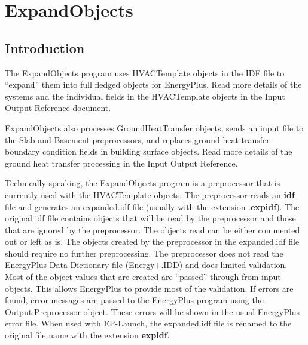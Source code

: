 \section{ExpandObjects}

\subsection{Introduction}\label{ExpandObjects}

The ExpandObjects program uses HVACTemplate objects in the IDF file to ``expand'' them into full fledged objects for EnergyPlus. Read more details of the systems and the individual fields in the HVACTemplate objects in the Input Output Reference document.

ExpandObjects also processes GroundHeatTransfer objects, sends an input file to the Slab and Basement preprocessors, and replaces ground heat transfer boundary condition fields in building surface objects. Read more details of the ground heat transfer processing in the Input Output Reference.

Technically speaking, the ExpandObjects program is a preprocessor that is currently used with the HVACTemplate objects. The preprocessor reads an \textbf{idf} file and generates an expanded.idf file (usually with the extension .\textbf{expidf}). The original idf file contains objects that will be read by the preprocessor and those that are ignored by the preprocessor. The objects read can be either commented out or left as is. The objects created by the preprocessor in the expanded.idf file should require no further preprocessing. The preprocessor does not read the EnergyPlus Data Dictionary file (Energy+.IDD) and does limited validation. Most of the object values that are created are ``passed'' through from input objects. This allows EnergyPlus to provide most of the validation. If errors are found, error messages are passed to the EnergyPlus program using the Output:Preprocessor object. These errors will be shown in the usual EnergyPlus error file. When used with EP-Launch, the expanded.idf file is renamed to the original file name with the extension \textbf{expidf}.
